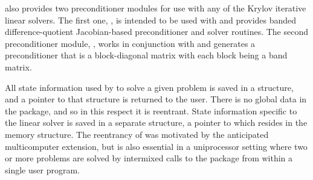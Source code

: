 {\cvodes} also provides two preconditioner modules for use with any of
the Krylov iterative linear solvers.  The first one, {\cvbandpre}, is
intended to be used with {\nvecs} and provides banded difference-quotient
Jacobian-based preconditioner and solver routines.  The second
preconditioner module, {\cvbbdpre}, works in conjunction with {\nvecp}
and generates a preconditioner that is a block-diagonal matrix with
each block being a band matrix.

All state information used by {\cvodes} to solve a given problem is saved
in a structure, and a pointer to that structure is returned to the
user.  There is no global data in the {\cvodes} package, and so in this
respect it is reentrant. State information specific to the linear
solver is saved in a separate structure, a pointer to which resides in
the {\cvodes} memory structure. The reentrancy of {\cvodes} was motivated
by the anticipated multicomputer extension, but is also essential
in a uniprocessor setting where two or more problems are solved by
intermixed calls to the package from within a single user program.

